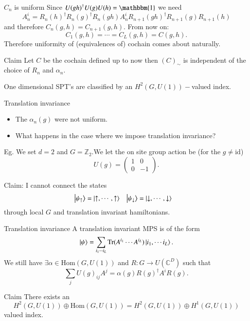 \documentclass{beamer}
\newcommand{\id}{\mathbbm{1}}
\newcommand{\CC}{\mathbb{C}}
\newcommand{\ZZ}{\mathbb{Z}}
\begin{document}
\begin{frame}{$C_n$ is uniform}
Since $U(gh)^\dagger U(g)U(h)=\id$ we need
\begin{equation}
A_n^i=R_n(h)^\dagger R_n(g)^\dagger R_{n}(gh) A^i_n R_{n+1}(gh)^\dagger R_{n+1}(g) R_{n+1}(h)
\end{equation}
and therefore $C_n(g,h)=C_{n+1}(g,h)$. From now on:
\[C_1(g,h)=\cdots=C_L(g,h)=C(g,h).\]
\pause
Therefore uniformity of (equivalences of) cochain comes about naturally.
\pause
\begin{block}{Claim}
Let $C$ be the cochain defined up to now then $(C)_\sim$ is independent of the choice of $R_n$ and $\alpha_n$.
\end{block}
\pause
One dimensional SPT's are classified by an $H^2(G,U(1))-$valued index.
\end{frame}

\begin{frame}{Translation invariance}
\begin{itemize}
\item The $\alpha_n(g)$ were not uniform.
\pause
\item What happens in the case where we impose translation invariance?
\end{itemize}
Eg. We set $d=2$ and $G=\ZZ_2$.\pause We let the on site group action be (for the $g\neq \text{id}$)
\[U(g)=\begin{pmatrix}1&0\\0&-1\end{pmatrix}.\]
\pause
\begin{block}{Claim:}
I cannot connect the states
\begin{align*}
\ket{\psi_\uparrow}&=\ket{\uparrow,\cdots,\uparrow}&\ket{\psi_\downarrow}&=\ket{\downarrow,\cdots,\downarrow}
\end{align*}
through local $G$ and translation invariant hamiltonians.
\end{block}
\end{frame}

\begin{frame}{Translation invariance}
A translation invariant MPS is of the form
\[\ket{\psi}=\sum_{i_1\cdots i_L}\textrm{Tr}(A^{i_1}\cdots A^{i_L})\ket{i_1,\cdots i_L}.\]
\pause
We still have $\exists \alpha\in\text{Hom}(G,U(1))$ and $R:G\rightarrow U(\CC^D)$ such that
 \[\sum_j U(g)_{ij}A^j=\alpha(g) R(g)^\dagger A^i R(g).\]
\pause
\begin{block}{Claim}
There exists an
\[H^2(G,U(1))\oplus \text{Hom}(G,U(1))=H^2(G,U(1))\oplus H^1(G,U(1))\]
valued index.
\end{block}
\end{frame}
\end{document}
